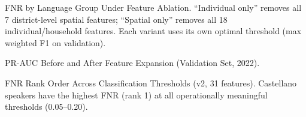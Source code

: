 \documentclass[notitlepage,12pt]{jedm}
\begin{document}
\begin{table}[H]
  \caption{FNR by Language Group Under Feature Ablation. ``Individual only'' removes all 7 district-level spatial features; ``Spatial only'' removes all 18 individual/household features. Each variant uses its own optimal threshold (max weighted F1 on validation).}\vspace*{1ex}
  \label{tab:ablation}
  
\end{table}

\begin{table}[H]
  \caption{PR-AUC Before and After Feature Expansion (Validation Set, 2022).}\vspace*{1ex}
  \label{tab:prauc_comparison}
  
\end{table}

\begin{table}[H]
  \centering
  \caption{FNR Rank Order Across Classification Thresholds (v2, 31 features). Castellano speakers have the highest FNR (rank 1) at all operationally meaningful thresholds (0.05--0.20).}\vspace*{1ex}
  \label{tab:threshold_sweep}
  
\end{table}

\clearpage


\end{document}
